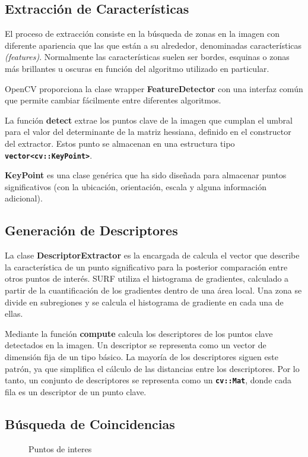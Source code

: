 \subsection{Extracción de Características}

El proceso de extracción consiste en la búsqueda de zonas en la imagen
con diferente apariencia que las que están a su alrededor, denominadas características \textit{(features)}. Normalmente las características suelen ser bordes, esquinas o zonas más brillantes u oscuras en
función del algoritmo utilizado en particular.

OpenCV proporciona la clase wrapper \textbf{FeatureDetector} con una interfaz común que permite
cambiar fácilmente entre diferentes algoritmos.


La función \textbf{detect} extrae los puntos clave de la imagen que
cumplan el umbral para el valor del determinante de la matriz
hessiana, definido en el constructor del extractor. Estos punto se
almacenan en una estructura tipo \textbf{\texttt{vector<cv::KeyPoint>}}.

\textbf{KeyPoint} es una clase genérica que ha sido diseñada para
almacenar puntos significativos (con la ubicación, orientación, escala
y alguna información adicional).

\subsection{Generación de Descriptores}
La clase \textbf{DescriptorExtractor} es la encargada de calcula
el vector que describe la característica de un punto significativo
para la posterior comparación entre otros puntos de interés. SURF
utiliza el histograma de gradientes, calculado a partir de la
cuantificación de los gradientes dentro de una área local. Una zona se divide
en subregiones y se calcula el histograma de gradiente en cada una de
ellas.

Mediante la función \textbf{compute} calcula los descriptores de los
puntos clave detectados en la imagen. Un descriptor se representa como
un vector de dimensión fija de un tipo básico. La mayoría de los
descriptores siguen este patrón, ya que simplifica el cálculo de las
distancias entre los descriptores. Por lo tanto, un conjunto de
descriptores se representa como un \textbf{\texttt{cv::Mat}}, donde cada fila
es un descriptor de un punto clave.

\subsection{Búsqueda de Coincidencias}
\begin{figure}
\centering
{}
\caption{Puntos de interes} \label{fig:keypoints}
\end{figure}



